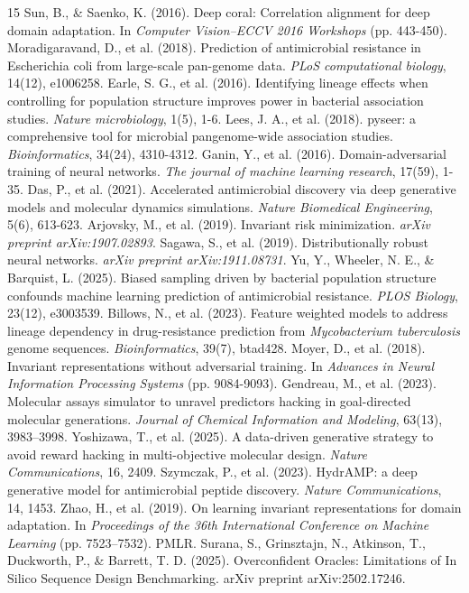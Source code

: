 \documentclass{article}
\begin{document}
\label{sec:references}
\begin{thebibliography}{15}
Sun, B., \& Saenko, K. (2016). Deep coral: Correlation alignment for deep domain adaptation. In \textit{Computer Vision--ECCV 2016 Workshops} (pp. 443-450).
Moradigaravand, D., et al. (2018). Prediction of antimicrobial resistance in Escherichia coli from large-scale pan-genome data. \textit{PLoS computational biology}, 14(12), e1006258.
Earle, S. G., et al. (2016). Identifying lineage effects when controlling for population structure improves power in bacterial association studies. \textit{Nature microbiology}, 1(5), 1-6.
Lees, J. A., et al. (2018). pyseer: a comprehensive tool for microbial pangenome-wide association studies. \textit{Bioinformatics}, 34(24), 4310-4312.
Ganin, Y., et al. (2016). Domain-adversarial training of neural networks. \textit{The journal of machine learning research}, 17(59), 1-35.
Das, P., et al. (2021). Accelerated antimicrobial discovery via deep generative models and molecular dynamics simulations. \textit{Nature Biomedical Engineering}, 5(6), 613-623.
Arjovsky, M., et al. (2019). Invariant risk minimization. \textit{arXiv preprint arXiv:1907.02893}.
Sagawa, S., et al. (2019). Distributionally robust neural networks. \textit{arXiv preprint arXiv:1911.08731}.
Yu, Y., Wheeler, N. E., \& Barquist, L. (2025). Biased sampling driven by bacterial population structure confounds machine learning prediction of antimicrobial resistance. \textit{PLOS Biology}, 23(12), e3003539.
Billows, N., et al. (2023). Feature weighted models to address lineage dependency in drug-resistance prediction from \textit{Mycobacterium tuberculosis} genome sequences. \textit{Bioinformatics}, 39(7), btad428.
Moyer, D., et al. (2018). Invariant representations without adversarial training. In \textit{Advances in Neural Information Processing Systems} (pp. 9084-9093).
Gendreau, M., et al. (2023). Molecular assays simulator to unravel predictors hacking in goal-directed molecular generations. \textit{Journal of Chemical Information and Modeling}, 63(13), 3983--3998.
Yoshizawa, T., et al. (2025). A data-driven generative strategy to avoid reward hacking in multi-objective molecular design. \textit{Nature Communications}, 16, 2409.
Szymczak, P., et al. (2023). HydrAMP: a deep generative model for antimicrobial peptide discovery. \textit{Nature Communications}, 14, 1453.
Zhao, H., et al. (2019). On learning invariant representations for domain adaptation. In \textit{Proceedings of the 36th International Conference on Machine Learning} (pp. 7523--7532). PMLR.
Surana, S., Grinsztajn, N., Atkinson, T., Duckworth, P., \& Barrett, T. D. (2025). Overconfident Oracles: Limitations of In Silico Sequence Design Benchmarking. arXiv preprint arXiv:2502.17246.
\end{thebibliography}
\end{document}
